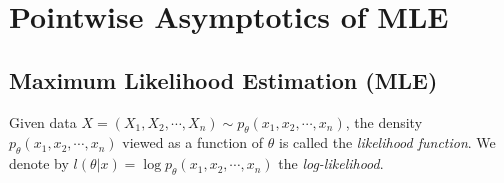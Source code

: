 \documentclass[a4paper]{article}
\begin{document}
\section{Pointwise Asymptotics of MLE}

\subsection{Maximum Likelihood Estimation (MLE)}

\begin{defi}
	Given data $X = (X_1,X_2,\cdots,X_n) \sim p_{\theta}(x_1,x_2,\cdots,x_n)$, the density $p_{\theta}(x_1,x_2,\cdots,x_n)$ viewed as a function of $\theta$ is called the \emph{likelihood function}. We denote by $l(\theta|x) = \log p_{\theta}(x_1,x_2,\cdots,x_n)$ the \emph{log-likelihood}.
\end{defi}
\end{document}
